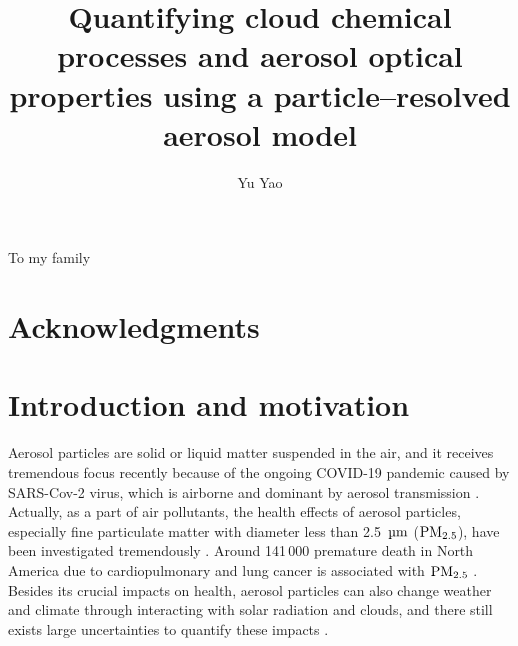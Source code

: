 \documentclass[edeposit,fullpage]{uiucthesis2009}
\begin{document}
\title{Quantifying cloud chemical processes and aerosol optical properties using a particle--resolved aerosol model}
\author{Yu Yao}
\phdthesis
{}
\maketitle


\frontmatter

\begin{abstract}

\end{abstract}

\begin{dedication}
To my family
\end{dedication}

\chapter*{Acknowledgments}


%


\tableofcontents

\mainmatter


\chapter{Introduction and motivation}
\label{chapter1}
Aerosol particles are solid or liquid matter suspended in the air, and it receives tremendous focus recently because of the ongoing COVID-19 pandemic caused by SARS-Cov-2 virus, which is airborne and dominant by aerosol transmission \citep{prather2020reducing,zhang2020identifying, miller2021transmission, greenhalgh2021ten}. Actually, as a part of air pollutants, the health effects of aerosol particles, especially fine particulate matter with diameter less than 2.5~$\rm \mu m$ ($\rm PM_{2.5}$), have been investigated tremendously \citep{bell2007spatial, fann2012estimating}. Around 141\,000 premature death in North America due to cardiopulmonary and lung cancer is associated with $\rm PM_{2.5}$ \citep{anenberg2010estimate}. Besides its crucial impacts on health, aerosol particles can also change weather and climate through interacting with solar radiation and clouds, and there still exists large uncertainties to quantify these impacts \citep{IPCC_CHAPTER7, seinfeld2016improving, fan2016review, bellouin2020bounding}. 
\end{document}
